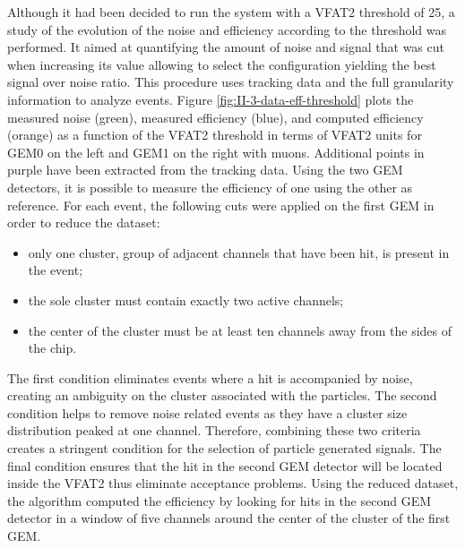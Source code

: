       Although it had been decided to run the system with a VFAT2 threshold of 25, a study of the evolution of the noise and efficiency according to the threshold was performed. It aimed at quantifying the amount of noise and signal that was cut when increasing its value allowing to select the configuration yielding the best signal over noise ratio. This procedure uses tracking data and the full granularity information to analyze events. Figure \ref{fig:II-3-data-eff-threshold} plots the measured noise (green), measured efficiency (blue), and computed efficiency (orange) as a function of the VFAT2 threshold in terms of VFAT2 units for GEM0 on the left and GEM1 on the right with muons. Additional points in purple have been extracted from the tracking data. Using the two GEM detectors, it is possible to measure the efficiency of one using the other as reference. For each event, the following cuts were applied on the first GEM in order to reduce the dataset:
      \begin{itemize}
        \item only one cluster, group of adjacent channels that have been hit, is present in the event;
        \item the sole cluster must contain exactly two active channels;
        \item the center of the cluster must be at least ten channels away from the sides of the chip.
      \end{itemize}
      The first condition eliminates events where a hit is accompanied by noise, creating an ambiguity on the cluster associated with the particles. The second condition helps to remove noise related events as they have a cluster size distribution peaked at one channel. Therefore, combining these two criteria creates a stringent condition for the selection of particle generated signals. The final condition ensures that the hit in the second GEM detector will be located inside the VFAT2 thus eliminate acceptance problems. Using the reduced dataset, the algorithm computed the efficiency by looking for hits in the second GEM detector in a window of five channels around the center of the cluster of the first GEM. \\

